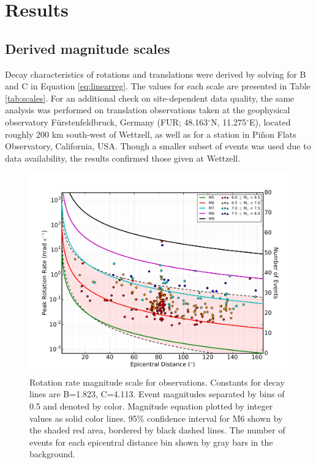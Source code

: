 \documentclass{gji}
\begin{document}
\section{Results}\label{sec:results}
\subsection{Derived magnitude scales}
Decay characteristics of rotations and translations were derived by solving for B and C in Equation \ref{eq:linearreg}. The values for each scale are presented in Table \ref{tab:scales}. For an additional check on site-dependent data quality, the same analysis was performed on translation observations taken at the geophysical observatory F\"urstenfeldbruck, Germany (FUR; 48.163$^\circ$N, 11.275$^\circ$E), located roughly 200 km south-west of Wettzell, as well as for a station in Pi\~non Flats Observatory, California, USA. Though a smaller subset of events was used due to data availability, the results confirmed those given at Wettzell. 


\begin{figure}
\centerline{\includegraphics[width=1.0\textwidth]{RT_WET}}
\caption{Rotation rate magnitude scale for observations. Constants for decay lines are B=1.823, C=4.113. Event magnitudes separated by bins of 0.5 and denoted by color. Magnitude equation plotted by integer values as solid color lines. 95\% confidence interval for M6 shown by the shaded red area, bordered by black dashed lines. The number of events for each epicentral distance bin shown by gray bars in the background.}
\label{fig:rr_obs}
\end{figure}
\end{document}
